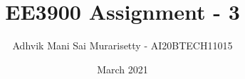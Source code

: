 \documentclass[journal,12pt,twocolumn]{IEEEtran}
\date{March 2021}
\DeclareMathOperator*{\Res}{Res}
\begin{document}
\newcommand{\BEQA}{\begin{eqnarray}}
\newcommand{\EEQA}{\end{eqnarray}}
\newcommand{\define}{\stackrel{\triangle}{=}}

\raggedbottom
\setlength{\parindent}{0pt}
\providecommand{\mbf}{\mathbf}
\providecommand{\pr}[1]{\ensuremath{\Pr\left(#1\right)}}
\providecommand{\qfunc}[1]{\ensuremath{Q\left(#1\right)}}
\providecommand{\fn}[1]{\ensuremath{f\left({#1}\right)}}
\providecommand{\e}[1]{\ensuremath{E\left(#1\right)}}
\providecommand{\sbrak}[1]{\ensuremath{{}\left[#1\right]}}
\providecommand{\lsbrak}[1]{\ensuremath{{}\left[#1\right.}}
\providecommand{\rsbrak}[1]{\ensuremath{{}\left.#1\right]}}
\providecommand{\brak}[1]{\ensuremath{\left(#1\right)}}
\providecommand{\lbrak}[1]{\ensuremath{\left(#1\right.}}
\providecommand{\rbrak}[1]{\ensuremath{\left.#1\right)}}
\providecommand{\cbrak}[1]{\ensuremath{\left\{#1\right\}}}
\providecommand{\lcbrak}[1]{\ensuremath{\left\{#1\right.}}
\providecommand{\rcbrak}[1]{\ensuremath{\left.#1\right\}}}
\theoremstyle{remark}
\newtheorem{rem}{Remark}
\newcommand{\sgn}{\mathop{\mathrm{sgn}}}
\newcommand{\comb}[2]{{}^{#1}\mathrm{C}_{#2}}
\providecommand{\abs}[1]{\vert#1\vert}
\providecommand{\res}[1]{\Res\displaylimits_{#1}} 
\providecommand{\norm}[1]{\lVert#1\rVert}
\providecommand{\mtx}[1]{\mathbf{#1}}
\providecommand{\mean}[1]{E\sbrak{ #1 }}
\providecommand{\fourier}{\overset{\mathcal{F}}{ \rightleftharpoons}}
\providecommand{\system}{\overset{\mathcal{H}}{ \longleftrightarrow}}
\newcommand{\solution}{\noindent \textbf{Solution: }}
\newcommand{\cosec}{\,\text{cosec}\,}
\providecommand{\dec}[2]{\ensuremath{\overset{#1}{\underset{#2}{\gtrless}}}}
\newcommand{\myvec}[1]{\ensuremath{\begin{pmatrix}#1\end{pmatrix}}}
\newcommand{\mydet}[1]{\ensuremath{\begin{vmatrix}#1\end{vmatrix}}}
\makeatletter
{}
\makeatother
\let\StandardTheFigure\thefigure
\let\vec\mathbf
\vspace{3cm}
\title{EE3900 Assignment - 3}
\author{Adhvik Mani Sai Murarisetty - AI20BTECH11015}
\maketitle
\newpage
\bigskip
\renewcommand{\thetable}{\theenumi}
\end{document}
